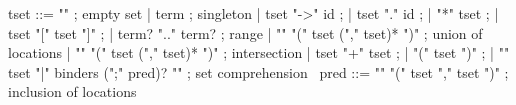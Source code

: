 \begin{syntax}
  tset ::= "\empty" ; empty set 
       | term ; singleton
       | tset "->" id ;
       | tset "." id  ;
       | "*" tset ;
       | tset "[" tset "]" ;
       | term? ".." term? ; range
       | "\union" "(" tset ("," tset)* ")" ; union of locations
       | "\inter" "(" tset ("," tset)* ")" ; intersection
       | tset "+" tset ;
       | "(" tset ")" ;
       | "{" tset "|" binders (";" pred)? "}" ; set comprehension
       \
  pred ::= "\subset" "(" tset "," tset ")" ; inclusion of locations
\end{syntax}

